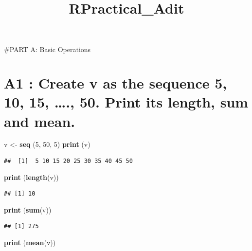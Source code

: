 \documentclass[
]{article}
\title{RPractical\_Adit}
\author{}
\date{\vspace{-2.5em}}
\newenvironment{Shaded}{\begin{snugshade}}{\end{snugshade}}
\newcommand{\DecValTok}[1]{\textcolor[rgb]{0.00,0.00,0.81}{#1}}
\newcommand{\FunctionTok}[1]{\textcolor[rgb]{0.13,0.29,0.53}{\textbf{#1}}}
\newcommand{\NormalTok}[1]{#1}
\newcommand{\OtherTok}[1]{\textcolor[rgb]{0.56,0.35,0.01}{#1}}
\begin{document}
\maketitle

\#PART A: Basic Operations

\section{\texorpdfstring{A1 : Create v as the sequence 5, 10, 15,
\ldots., 50. Print its length, sum and mean.\\
}{A1 : Create v as the sequence 5, 10, 15, \ldots., 50. Print its length, sum and mean. }}\label{a1-create-v-as-the-sequence-5-10-15-.-50.-print-its-length-sum-and-mean.}

\begin{Shaded}
\begin{Highlighting}[]
\NormalTok{v }\OtherTok{\textless{}{-}} \FunctionTok{seq}\NormalTok{ (}\DecValTok{5}\NormalTok{, }\DecValTok{50}\NormalTok{, }\DecValTok{5}\NormalTok{)}
\FunctionTok{print}\NormalTok{ (v)}
\end{Highlighting}
\end{Shaded}

\begin{verbatim}
##  [1]  5 10 15 20 25 30 35 40 45 50
\end{verbatim}

\begin{Shaded}
\begin{Highlighting}[]
\FunctionTok{print}\NormalTok{ (}\FunctionTok{length}\NormalTok{(v))}
\end{Highlighting}
\end{Shaded}

\begin{verbatim}
## [1] 10
\end{verbatim}

\begin{Shaded}
\begin{Highlighting}[]
\FunctionTok{print}\NormalTok{ (}\FunctionTok{sum}\NormalTok{(v))}
\end{Highlighting}
\end{Shaded}

\begin{verbatim}
## [1] 275
\end{verbatim}

\begin{Shaded}
\begin{Highlighting}[]
\FunctionTok{print}\NormalTok{ (}\FunctionTok{mean}\NormalTok{(v))}
\end{Highlighting}
\end{Shaded}
\end{document}

